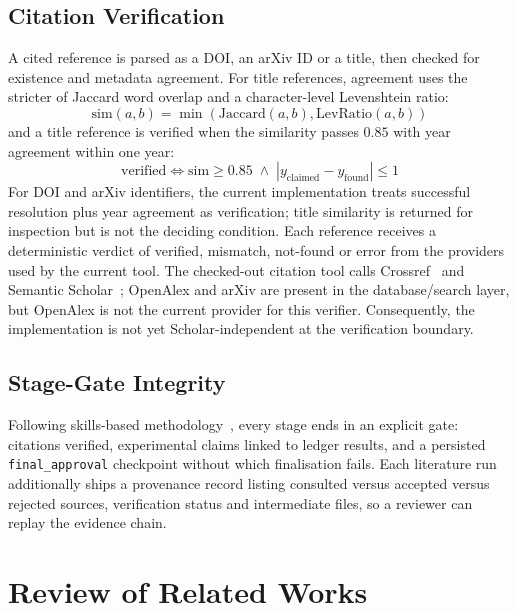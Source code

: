 \documentclass[12pt,a4paper]{report}
\numberwithin{equation}{chapter}
\begin{document}
\subsection{Citation Verification}

A cited reference is parsed as a DOI, an arXiv ID or a title, then checked for
existence and metadata agreement. For title references, agreement uses the
stricter of Jaccard word overlap and a character-level Levenshtein ratio:
\begin{equation}
\mathrm{sim}(a, b) = \min(\mathrm{Jaccard}(a, b), \mathrm{LevRatio}(a, b))
\end{equation}
and a title reference is verified when the similarity passes $0.85$ with year
agreement within one year:
\begin{equation}
\mathrm{verified} \iff \mathrm{sim} \geq 0.85 \;\land\; |y_{\mathrm{claimed}} - y_{\mathrm{found}}| \leq 1
\end{equation}
For DOI and arXiv identifiers, the current implementation treats successful
resolution plus year agreement as verification; title similarity is returned
for inspection but is not the deciding condition. Each reference receives a
deterministic verdict of verified, mismatch, not-found or error from the
providers used by the current tool. The checked-out citation tool calls
Crossref~\cite{crossref} and Semantic Scholar~\cite{s2}; OpenAlex and arXiv
are present in the database/search layer, but OpenAlex is not the current
provider for this verifier. Consequently, the implementation is not yet
Scholar-independent at the verification boundary.

\subsection{Stage-Gate Integrity}

Following skills-based methodology~\cite{ars}, every stage ends in an
explicit gate: citations verified, experimental claims linked to ledger
results, and a persisted \texttt{final\_approval} checkpoint without which
finalisation fails. Each literature run additionally ships a provenance
record listing consulted versus accepted versus rejected sources,
verification status and intermediate files, so a reviewer can replay the
evidence chain.

\section{Review of Related Works}
\end{document}
